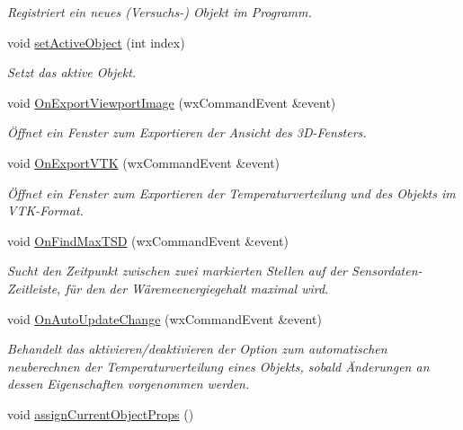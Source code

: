 \begin{DoxyCompactItemize}
\begin{DoxyCompactList}\small\item\em Registriert ein neues (Versuchs-\/) Objekt im Programm. \end{DoxyCompactList}\item 
void \hyperlink{classGUIMainWindow_a84b96a8b25d748985f4960326a977b22}{set\-Active\-Object} (int index)
\begin{DoxyCompactList}\small\item\em Setzt das aktive Objekt. \end{DoxyCompactList}\item 
void \hyperlink{classGUIMainWindow_a9199006080109ef0235dacfc83456338}{On\-Export\-Viewport\-Image} (wx\-Command\-Event \&event)
\begin{DoxyCompactList}\small\item\em Öffnet ein Fenster zum Exportieren der Ansicht des 3\-D-\/\-Fensters. \end{DoxyCompactList}\item 
void \hyperlink{classGUIMainWindow_a48b4417c2eaa97a6eea4438f67a315e7}{On\-Export\-V\-T\-K} (wx\-Command\-Event \&event)
\begin{DoxyCompactList}\small\item\em Öffnet ein Fenster zum Exportieren der Temperaturverteilung und des Objekts im V\-T\-K-\/\-Format. \end{DoxyCompactList}\item 
void \hyperlink{classGUIMainWindow_af21ea342f481cfdd01ed04005f903ad5}{On\-Find\-Max\-T\-S\-D} (wx\-Command\-Event \&event)
\begin{DoxyCompactList}\small\item\em Sucht den Zeitpunkt zwischen zwei markierten Stellen auf der Sensordaten-\/\-Zeitleiste, für den der Wäremeenergiegehalt maximal wird. \end{DoxyCompactList}\item 
void \hyperlink{classGUIMainWindow_a6934b1307d1d32822c20505487cc79bf}{On\-Auto\-Update\-Change} (wx\-Command\-Event \&event)
\begin{DoxyCompactList}\small\item\em Behandelt das aktivieren/deaktivieren der Option zum automatischen neuberechnen der Temperaturverteilung eines Objekts, sobald Änderungen an dessen Eigenschaften vorgenommen werden. \end{DoxyCompactList}\item 
void \hyperlink{classGUIMainWindow_a1cb2c4f39b9ba971d51ab682f29b7f23}{assign\-Current\-Object\-Props} ()

\end{DoxyCompactItemize}
